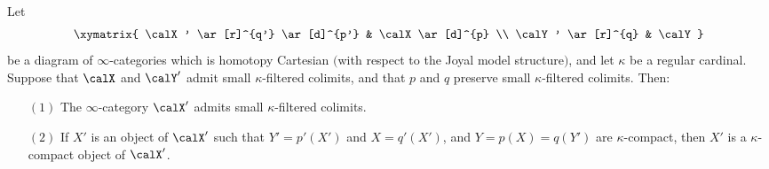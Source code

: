 \begin{lemma}\label{yoris}
Let $$ \xymatrix{ \calX' \ar[r]^{q'} \ar[d]^{p'} & \calX \ar[d]^{p} \\
\calY' \ar[r]^{q} & \calY }$$
be a diagram of $\infty$-categories which is homotopy Cartesian $($with respect to the Joyal model structure$)$, and let $\kappa$ be a regular cardinal. Suppose that $\calX$ and $\calY'$ admit small
$\kappa$-filtered colimits, and that $p$ and $q$ preserve small $\kappa$-filtered colimits.
Then:
\begin{itemize}
\item[$(1)$] The $\infty$-category $\calX'$ admits small $\kappa$-filtered colimits.
\item[$(2)$] If $X'$ is an object of $\calX'$ such that $Y' = p'(X')$ and $X = q'(X')$,
and $Y = p(X) = q(Y')$ are $\kappa$-compact, then $X'$ is a $\kappa$-compact object of $\calX'$.
\end{itemize}
\end{lemma}

